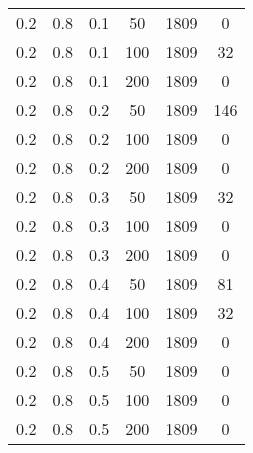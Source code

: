 \begin{table}[h]
\begin{center}
\begin{threeparttable}
\begin{tabular}{|c|c|c|c|c|c|}
	   \hline
		0.2 &  0.8 &  0.1 &   50 &  1809 &     0 \\
		0.2 &  0.8 &  0.1 &  100 &  1809 &    32 \\
		0.2 &  0.8 &  0.1 &  200 &  1809 &     0 \\
	   \hline
		0.2 &  0.8 &  0.2 &   50 &  1809 &   146 \\
		0.2 &  0.8 &  0.2 &  100 &  1809 &     0 \\
		0.2 &  0.8 &  0.2 &  200 &  1809 &     0 \\
	   \hline
		0.2 &  0.8 &  0.3 &   50 &  1809 &    32 \\
		0.2 &  0.8 &  0.3 &  100 &  1809 &     0 \\
		0.2 &  0.8 &  0.3 &  200 &  1809 &     0 \\
	   \hline
		0.2 &  0.8 &  0.4 &   50 &  1809 &    81 \\
		0.2 &  0.8 &  0.4 &  100 &  1809 &    32 \\
		0.2 &  0.8 &  0.4 &  200 &  1809 &     0 \\
	   \hline
		0.2 &  0.8 &  0.5 &   50 &  1809 &     0 \\
		0.2 &  0.8 &  0.5 &  100 &  1809 &     0 \\
		0.2 &  0.8 &  0.5 &  200 &  1809 &     0 \\
	   \hline
    
    		\end{tabular}
        \end{threeparttable}
	\end{center}
\end{table}
